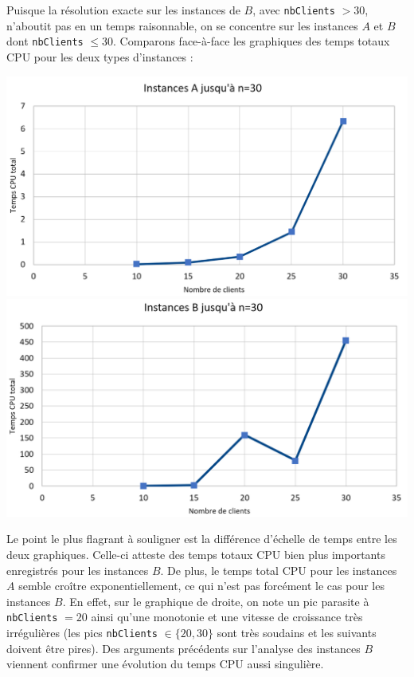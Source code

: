 \documentclass[french, 11pt, a4paper]{article} %
\newcommand{\smb}{\smallbreak}
\begin{document}
Puisque la résolution exacte sur les instances de $B$, avec \verb+nbClients+ $>30$, n'aboutit pas en un temps raisonnable,
on se concentre sur les instances $A$ et $B$ dont \verb+nbClients+ $\leq 30$.
Comparons face-à-face les graphiques des temps totaux CPU pour les deux types d'instances :
\begin{center}
    \includegraphics[scale=0.34]{GraphInstA30.PNG}
    \includegraphics[scale=0.34]{GraphInstB30.PNG}
\end{center}

Le point le plus flagrant à souligner est la différence d'échelle de temps entre les deux graphiques. Celle-ci 
atteste des temps totaux CPU bien plus importants enregistrés pour les instances $B$.
\smb De plus, le temps total CPU pour les instances $A$ semble croître exponentiellement, ce qui n'est pas forcément
le cas pour les instances $B$. En effet, sur le graphique de droite, on note un pic parasite à \verb+nbClients+ $=20$
ainsi qu'une monotonie et une vitesse de croissance très irrégulières (les pics \verb+nbClients+ $\in \{20,30\}$ sont très soudains et les suivants doivent être pires).
Des arguments précédents sur l'analyse des instances $B$ viennent confirmer une évolution du temps CPU aussi singulière.
\end{document}
